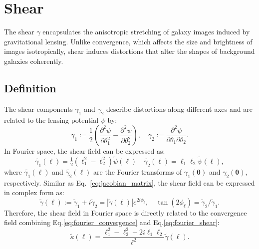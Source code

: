 \section{Shear}
The shear $\gamma$ encapsulates the anisotropic stretching of galaxy images induced by gravitational lensing. Unlike convergence, which affects the size and brightness of images isotropically, shear induces distortions that alter the shapes of background galaxies coherently. 
\subsection{Definition}
The shear components $\gamma_1$ and $\gamma_2$ describe distortions along different axes and are related to the lensing potential $\psi$ by:
\begin{equation}
    \label{eq:physical_shear}
    \gamma_1 := \frac{1}{2} \left( \frac{\partial^2 \psi}{\partial \theta_1^2} - \frac{\partial^2 \psi}{\partial \theta_2^2} \right), \quad \gamma_2 := \frac{\partial^2 \psi}{\partial \theta_1 \partial \theta_2}.
\end{equation}
In Fourier space, the shear field can be expressed as:
\begin{equation}
    \label{eq:fourier_shear}
    \tilde{\gamma_1}(\boldsymbol{\ell}) = \tfrac{1}{2} \left( \ell_1^2 - \ell_2^2 \right) \tilde{\psi}(\boldsymbol{\ell}) \quad
    \tilde{\gamma_2}(\boldsymbol{\ell}) = \ell_1 \ell_2 \tilde{\psi}(\boldsymbol{\ell}) ,
\end{equation}
where $\tilde{\gamma_1}(\boldsymbol{\ell})$ and $\tilde{\gamma_2}(\boldsymbol{\ell})$ are the Fourier transforms of $\gamma_1(\boldsymbol{\theta})$ and $\gamma_2(\boldsymbol{\theta})$, respectively. 
Similar as Eq.~\eqref{eq:jacobian_matrix}, the shear field can be expressed in complex form as:
\begin{equation}
    \label{eq:fourier_shear1}
    \tilde{\gamma}(\boldsymbol{\ell}) := \tilde{\gamma}_1 + i\tilde{\gamma}_2 = |\tilde{\gamma}(\boldsymbol{\ell})|e^{2i\phi_\ell}, \quad \tan (2\phi_\ell) = \tilde{\gamma}_2 / \tilde{\gamma}_1.
\end{equation}
Therefore, the shear field in Fourier space is directly related to the convergence field combining Eq.\eqref{eq:fourier_convergence} and Eq.\eqref{eq:fourier_shear}:
\begin{equation}
    \tilde{\kappa}(\boldsymbol{\ell}) = \frac{\ell_1^2 - \ell_2^2 + 2i\ell_1\ell_2}{\ell^2} \tilde{\gamma}(\boldsymbol{\ell}).
\end{equation}
